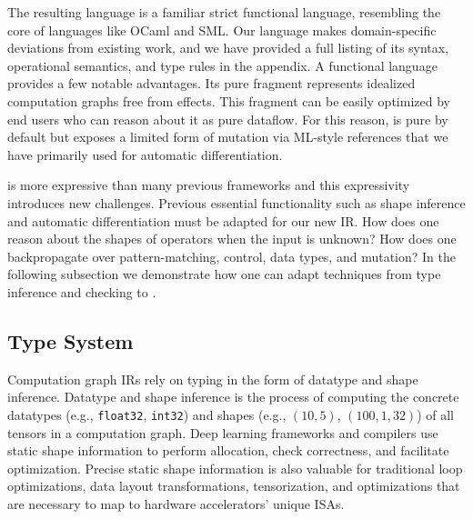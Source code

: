   The resulting language is a familiar strict functional language,
    resembling the core of languages like OCaml and SML.
  Our language makes domain-specific deviations from existing work,
    and we have provided a full listing
    of its syntax, operational semantics, and type rules
    in the appendix.
  A functional language provides a few notable advantages.
  Its pure fragment represents idealized computation graphs free
    from effects. This fragment can be easily optimized by end users who
    can reason about it as pure dataflow.
  For this reason, \relay is pure by default but exposes a limited
    form of mutation via ML-style references that we have
    primarily used for automatic differentiation.

  \relay is more expressive than many previous frameworks and this expressivity introduces new challenges.
    Previous essential functionality such
     as shape inference and automatic differentiation must be adapted for
     our new IR.
  How does one reason about the shapes of operators when the input is unknown?
  How does one backpropagate over pattern-matching, control, data types, and mutation?
  In the following subsection we demonstrate how one can adapt techniques
    from type inference and checking to \relay.

  \subsection{Type System}
  \label{subsec:type_system}

  Computation graph IRs rely on typing in the form of
    datatype and shape inference.
  Datatype and shape inference is the process of computing the
    concrete datatypes (e.g., \verb|float32|, \verb|int32|) and shapes (e.g., $(10, 5)$, $(100, 1, 32)$) of all
    tensors in a computation graph.
  Deep learning frameworks and compilers use static shape information
    to perform allocation, check correctness, and facilitate optimization.
  Precise static shape information is also valuable for traditional loop
    optimizations, data layout transformations, tensorization, and
    optimizations that are necessary to map to hardware accelerators' unique ISAs.

